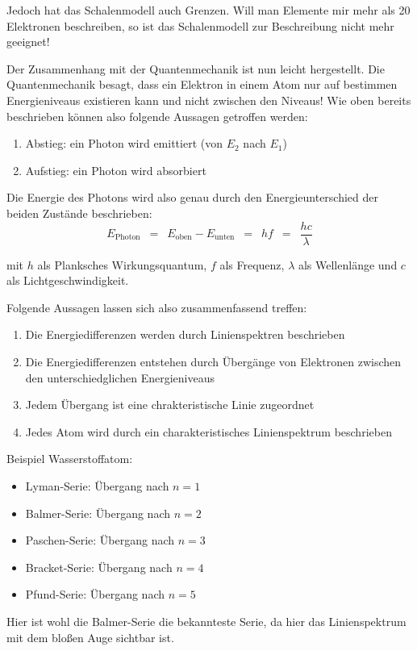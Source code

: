 \documentclass{article}
\newcommand{\widespace}{\enspace}
\newcommand{\wideeq}{\widespace = \widespace}
\begin{document}
Jedoch hat das Schalenmodell auch Grenzen. Will man Elemente mir mehr als 20 Elektronen beschreiben, so ist das Schalenmodell zur Beschreibung nicht mehr geeignet!


Der Zusammenhang mit der Quantenmechanik ist nun leicht hergestellt. Die Quantenmechanik besagt, dass ein Elektron in einem Atom nur auf bestimmen Energieniveaus existieren kann und nicht zwischen den Niveaus! Wie oben bereits beschrieben können also folgende Aussagen getroffen werden:
    \begin{enumerate}[label=\arabic*.]
        \item Abstieg: ein Photon wird emittiert (von $E_2$ nach $E_1$)
        \item Aufstieg: ein Photon wird absorbiert
    \end{enumerate}
Die Energie des Photons wird also genau durch den Energieunterschied der beiden Zustände beschrieben: 
\[
    E_\text{Photon} \wideeq E_\text{oben} - E_\text{unten}
    \wideeq h f \wideeq \frac{h c}{\lambda} 
\]

mit $h$ als Planksches Wirkungsquantum, $f$ als Frequenz, $\lambda$ als Wellenlänge und $c$ als Lichtgeschwindigkeit.

Folgende Aussagen lassen sich also zusammenfassend treffen:
\begin{enumerate}[label=\arabic*.]
        \item Die Energiedifferenzen werden durch Linienspektren beschrieben
        \item Die Energiedifferenzen entstehen durch Übergänge von Elektronen zwischen den unterschiedglichen Energieniveaus
        \item Jedem Übergang ist eine chrakteristische Linie zugeordnet
        \item Jedes Atom wird durch ein charakteristisches Linienspektrum beschrieben
    \end{enumerate}

Beispiel Wasserstoffatom:
\begin{itemize}
    \item Lyman-Serie: Übergang nach $n=1$
    \item Balmer-Serie: Übergang nach $n=2$
    \item Paschen-Serie: Übergang nach $n=3$
    \item Bracket-Serie: Übergang nach $n=4$
    \item Pfund-Serie: Übergang nach $n=5$
\end{itemize}
Hier ist wohl die Balmer-Serie die bekannteste Serie, da hier das Linienspektrum mit dem bloßen Auge sichtbar ist.
\end{document}
